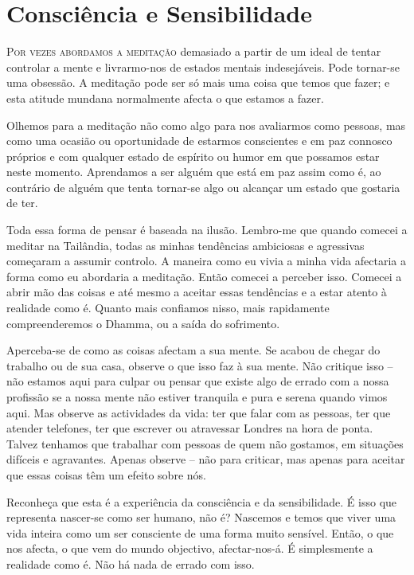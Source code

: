 \chapter{Consciência e Sensibilidade}

\lettrine{P}{or vezes abordamos a meditação} demasiado a partir de um ideal de tentar
controlar a mente e livrarmo-nos de estados mentais indesejáveis. Pode tornar-se
uma obsessão. A meditação pode ser só mais uma coisa que temos que fazer; e esta
atitude mundana normalmente afecta o que estamos a fazer.

Olhemos para a meditação não como algo para nos avaliarmos como pessoas, mas
como uma ocasião ou oportunidade de estarmos conscientes e em paz connosco
próprios e com qualquer estado de espírito ou humor em que possamos estar neste
momento. Aprendamos a ser alguém que está em paz assim como é, ao contrário de
alguém que tenta tornar-se algo ou alcançar um estado que gostaria de ter.

Toda essa forma de pensar é baseada na ilusão. Lembro-me que quando comecei a
meditar na Tailândia, todas as minhas tendências ambiciosas e agressivas
começaram a assumir controlo. A maneira como eu vivia a minha vida afectaria a
forma como eu abordaria a meditação. Então comecei a perceber isso. Comecei a
abrir mão das coisas e até mesmo a aceitar essas tendências e a estar atento à
realidade como é. Quanto mais confiamos nisso, mais rapidamente compreenderemos
o Dhamma, ou a saída do sofrimento.

Aperceba-se de como as coisas afectam a sua mente. Se acabou de chegar do
trabalho ou de sua casa, observe o que isso faz à sua mente. Não critique isso
-- não estamos aqui para culpar ou pensar que existe algo de errado com a nossa
profissão se a nossa mente não estiver tranquila e pura e serena quando vimos
aqui. Mas observe as actividades da vida: ter que falar com as pessoas, ter que
atender telefones, ter que escrever ou atravessar Londres na hora de ponta.
Talvez tenhamos que trabalhar com pessoas de quem não gostamos, em situações
difíceis e agravantes. Apenas observe -- não para criticar, mas apenas para
aceitar que essas coisas têm um efeito sobre nós.

Reconheça que esta é a experiência da consciência e da sensibilidade. É isso que
representa nascer-se como ser humano, não é? Nascemos e temos que viver uma vida
inteira como um ser consciente de uma forma muito sensível. Então, o que nos
afecta, o que vem do mundo objectivo, afectar-nos-á. É simplesmente a realidade
como é. Não há nada de errado com isso.

